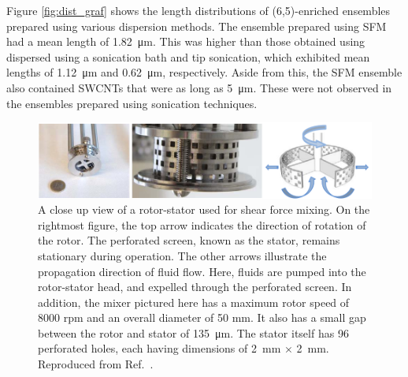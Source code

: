 Figure \ref{fig:dist_graf} shows the length distributions of (6,5)-enriched ensembles prepared using various dispersion methods. The ensemble prepared using SFM had a mean length of \SI{1.82}{\micro\meter}. This was higher than those obtained using dispersed using a sonication bath and tip sonication, which exhibited mean lengths of \SI{1.12}{\micro\meter} and \SI{0.62}{\micro\meter}, respectively. Aside from this, the SFM ensemble also contained SWCNTs that were as long as \SI{5}{\micro\meter}. These were not observed in the ensembles prepared using sonication techniques.

\begin{figure}[H]
	\centering
	\includegraphics[scale=0.4]{images/chapter_methods/mixing_paton}
	\caption{A close up view of a rotor-stator used for shear force mixing. On the rightmost figure, the top arrow indicates the direction of rotation of the rotor. The perforated screen, known as the stator, remains stationary during operation. The other arrows illustrate the propagation direction of fluid flow. Here, fluids are pumped into the rotor-stator head, and expelled through the perforated screen. In addition, the mixer pictured here has a maximum rotor speed of 8000 rpm and an overall diameter of 50 mm. It also has a small gap between the rotor and stator of \SI{135}{\micro\meter}. The stator itself has 96 perforated holes, each having dimensions of \SI{2}{\milli\meter} $\times$ \SI{2}{\milli\meter}. Reproduced from Ref.\ \cite{paton2014scalable}. }
	\label{fig:mixing_paton}
\end{figure}



